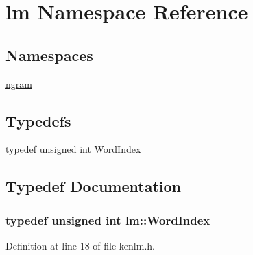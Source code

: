 \hypertarget{namespacelm}{}\section{lm Namespace Reference}
\label{namespacelm}
\subsection*{Namespaces}
\begin{DoxyCompactItemize}
\item 
 \hyperlink{namespacelm_1_1ngram}{ngram}
\end{DoxyCompactItemize}
\subsection*{Typedefs}
\begin{DoxyCompactItemize}
\item 
typedef unsigned int \hyperlink{namespacelm_aea554f766016a7141535a9f8f648766a}{Word\+Index}
\end{DoxyCompactItemize}


\subsection{Typedef Documentation}
\subsubsection[{\texorpdfstring{Word\+Index}{WordIndex}}]{\setlength{\rightskip}{0pt plus 5cm}typedef unsigned int {\bf lm\+::\+Word\+Index}}\hypertarget{namespacelm_aea554f766016a7141535a9f8f648766a}{}\label{namespacelm_aea554f766016a7141535a9f8f648766a}


Definition at line 18 of file kenlm.\+h.

